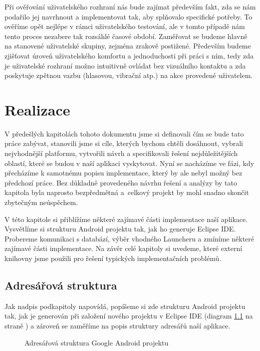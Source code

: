\documentclass[thesis=M,czech]{FITthesis}[2012/06/26]
\begin{document}
Při ověřování uživatelského rozhraní nás bude zajímat především fakt, zda se nám podařilo jej navrhnout a implementovat tak, aby splňovalo specifické potřeby. To ověříme opět nejlépe v rámci uživatelského testování, ale v tomto případě nám tento proces nezabere tak rozsáhlé časové období. Zaměřovat se budeme hlavně na stanovené uživatelské skupiny, zejména zrakově postižené. Především budeme zjišťovat úroveň uživatelského komfortu a jednoduchosti při práci s ním, tedy zda je uživatelské rozhraní možno intuitivně ovládat bez vizuálního kontaktu a zda poskytuje zpětnou vazbu (hlasovou, vibrační atp.) na akce provedené uživatelem.

\chapter{Realizace}
V předešlých kapitolách tohoto dokumentu jsme si definovali čím se bude tato práce zabývat, stanovili jsme si cíle, kterých bychom chtěli dosáhnout, vybrali nejvhodnější platformu, vytvořili návrh a specifikovali řešení nejdůležitějších oblastí, které se budou v naší aplikaci vyskytovat. Nyní se nacházíme ve fázi, kdy přecházíme k samotnému popisu implementace, který by ale nebyl možný bez předchozí práce. Bez důkladně provedeného návrhu řešení a analýzy by tato kapitola byla naprosto bezpředmětná a~celkový projekt by mohl snadno skončit zbytečným neúspěchem. 

V této kapitole si přiblížíme některé zajímavé části implementace naší aplikace. Vysvětlíme si strukturu Android projektu tak, jak ho generuje Eclipse IDE. Probereme komunikaci s databází, výběr vhodného Launcheru a zmíníme některé zajímavé části implementace. Na závěr celé kapitoly si uvedeme, které externí knihovny jsme použili pro řešení typických implementačních problémů.

\section{Adresářová struktura}
Jak nadpis podkapitoly napovídá, popíšeme si zde strukturu Android projektu \cite{android_project_structure} tak, jak je generován při založení nového projektu v Eclipse IDE (diagram \ref{fig:android_project_structure} na straně \pageref{fig:android_project_structure}) a zároveň se zaměříme na popis struktury adresářů naší aplikace.

\begin{figure}
\caption{Adresářová struktura Google Android projektu}
\label{fig:android_project_structure}
\end{figure}
\end{document}
